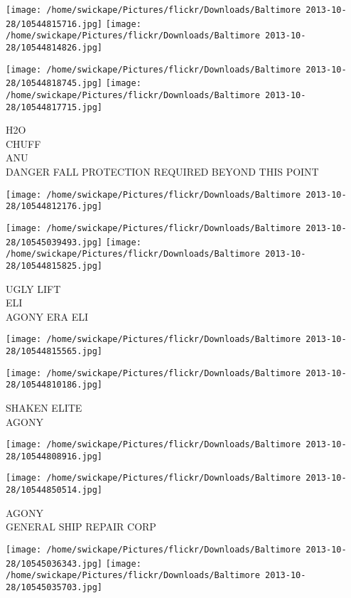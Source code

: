 \documentclass[10pt,letterpaper]{article}
\begin{document}
\texttt{[image: /home/swickape/Pictures/flickr/Downloads/Baltimore 2013-10-28/10544815716.jpg]}
\texttt{[image: /home/swickape/Pictures/flickr/Downloads/Baltimore 2013-10-28/10544814826.jpg]}

\texttt{[image: /home/swickape/Pictures/flickr/Downloads/Baltimore 2013-10-28/10544818745.jpg]}
\texttt{[image: /home/swickape/Pictures/flickr/Downloads/Baltimore 2013-10-28/10544817715.jpg]}

H2O\\
CHUFF\\
ANU\\
DANGER FALL PROTECTION REQUIRED BEYOND THIS POINT\\
\pagebreak

\texttt{[image: /home/swickape/Pictures/flickr/Downloads/Baltimore 2013-10-28/10544812176.jpg]}

\vspace{0.25in}
\texttt{[image: /home/swickape/Pictures/flickr/Downloads/Baltimore 2013-10-28/10545039493.jpg]}
\texttt{[image: /home/swickape/Pictures/flickr/Downloads/Baltimore 2013-10-28/10544815825.jpg]}

UGLY LIFT\\
ELI\\
AGONY ERA ELI\\
\pagebreak

\texttt{[image: /home/swickape/Pictures/flickr/Downloads/Baltimore 2013-10-28/10544815565.jpg]}

\vspace{0.25in}
\texttt{[image: /home/swickape/Pictures/flickr/Downloads/Baltimore 2013-10-28/10544810186.jpg]}

SHAKEN ELITE\\
AGONY\\
\pagebreak

\texttt{[image: /home/swickape/Pictures/flickr/Downloads/Baltimore 2013-10-28/10544808916.jpg]}

\vspace{0.25in}
\texttt{[image: /home/swickape/Pictures/flickr/Downloads/Baltimore 2013-10-28/10544850514.jpg]}

AGONY\\
GENERAL SHIP REPAIR CORP\\
\pagebreak

\texttt{[image: /home/swickape/Pictures/flickr/Downloads/Baltimore 2013-10-28/10545036343.jpg]}
\texttt{[image: /home/swickape/Pictures/flickr/Downloads/Baltimore 2013-10-28/10545035703.jpg]}
\end{document}

